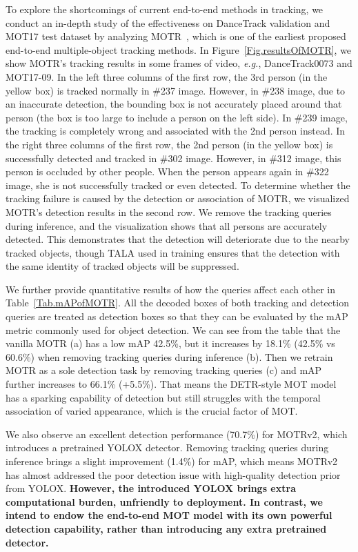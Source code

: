 \documentclass{article}
\begin{document}
To explore the shortcomings of current end-to-end methods in tracking, we conduct an in-depth study of the effectiveness on DanceTrack\cite{sun2022dancetrack} validation and MOT17 \cite{milan2016mot16} test dataset by analyzing MOTR~\cite{zeng2022motr}, which is one of the earliest proposed end-to-end multiple-object tracking methods. In Figure~\ref{Fig.resultsOfMOTR}, we show MOTR's tracking results in some frames of video, \textit{e.g.}, DanceTrack0073 and MOT17-09. In the left three columns of the first row, the 3rd person (in the yellow box) is tracked normally in \#237 image. However, in \#238 image, due to an inaccurate detection, the bounding box is not accurately placed around that person (the box is too large to include a person on the left side). In \#239 image, the tracking is completely wrong and associated with the 2nd person instead. In the right three columns of the first row, the 2nd person (in the yellow box) is successfully detected and tracked in \#302 image. However, in \#312 image, this person is occluded by other people. When the person appears again in \#322 image, she is not successfully tracked or even detected. To determine whether the tracking failure is caused by the detection or association of MOTR, we visualized MOTR's detection results in the second row. We remove the tracking queries during inference, and the visualization shows that all persons are accurately detected. This demonstrates that the detection will deteriorate due to the nearby tracked objects, though TALA used in training ensures that the detection with the same identity of tracked objects will be suppressed.

We further provide quantitative results of how the queries affect each other in Table~\ref{Tab.mAPofMOTR}. All the decoded boxes of both tracking and detection queries are treated as detection boxes so that they can be evaluated by the mAP metric commonly used for object detection. We can see from the table that the vanilla MOTR (a) has a low mAP 42.5\%, but it increases by 18.1\% (42.5\% vs 60.6\%) when removing tracking queries during inference (b). Then we retrain MOTR as a sole detection task by removing tracking queries (c) and mAP further increases to 66.1\% (+5.5\%). That means the DETR-style MOT model has a sparking capability of detection but still struggles with the temporal association of varied appearance, which is the crucial factor of MOT. 

We also observe an excellent detection performance (70.7\%) for MOTRv2, which introduces a pretrained YOLOX detector. Removing tracking queries during inference brings a slight improvement (1.4\%) for mAP, which means MOTRv2 has almost addressed the poor detection issue with high-quality detection prior from YOLOX. \textbf{However, the introduced YOLOX brings extra computational burden, unfriendly to deployment. In contrast, we intend to endow the end-to-end MOT model with its own powerful detection capability, rather than introducing any extra pretrained detector.}
\end{document}
